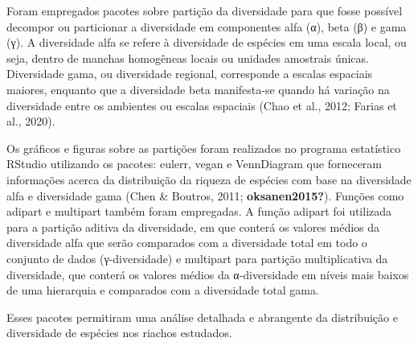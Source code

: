 \documentclass[
  letterpaper,
  DIV=11,
  numbers=noendperiod]{scrartcl}
\begin{document}
Foram empregados pacotes sobre partição da diversidade para que fosse
possível decompor ou particionar a diversidade em componentes alfa (α),
beta (β) e gama (γ). A diversidade alfa se refere à diversidade de
espécies em uma escala local, ou seja, dentro de manchas homogêneas
locais ou unidades amostrais únicas. Diversidade gama, ou diversidade
regional, corresponde a escalas espaciais maiores, enquanto que a
diversidade beta manifesta-se quando há variação na diversidade entre os
ambientes ou escalas espaciais (Chao et al., 2012; Farias et al., 2020).

Os gráficos e figuras sobre as partições foram realizados no programa
estatístico RStudio utilizando os pacotes: eulerr, vegan e VennDiagram
que forneceram informações acerca da distribuição da riqueza de espécies
com base na diversidade alfa e diversidade gama (Chen \& Boutros, 2011;
\textbf{oksanen2015?}). Funções como adipart e multipart também foram
empregadas. A função adipart foi utilizada para a partição aditiva da
diversidade, em que conterá os valores médios da diversidade alfa que
serão comparados com a diversidade total em todo o conjunto de dados
(γ-diversidade) e multipart para partição multiplicativa da diversidade,
que conterá os valores médios da α-diversidade em níveis mais baixos de
uma hierarquia e comparados com a diversidade total gama.

Esses pacotes permitiram uma análise detalhada e abrangente da
distribuição e diversidade de espécies nos riachos estudados.
\end{document}
